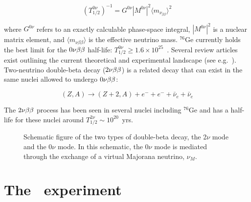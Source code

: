 		\begin{equation}
		\left( T_{1/2}^{0\nu}\right)^{-1} = G^{0\nu} |M^{0\nu}|^2 \langle m_{\nu_{\beta\beta}} \rangle^2  
		\end{equation} 

where $G^{0\nu}$ refers to an exactly calculable phase-space integral, 
$|M^{0\nu}|^2$ is a nuclear matrix element, and $\langle m_{\nu{\beta\beta}}\rangle$
is the effective neutrino mass.  $^{76}$Ge currently holds the best limit for
the $\nonubb$ half-life: $T^{0\nu}_{1/2}\geq 1.6\times10^{25}$~\cite{Bau99}.
Several review articles exist outlining the current theoretical and
experimental landscape (see e.g.~\cite{Ell02,Bara07}).  
Two-neutrino double-beta decay ($\twonubb$) is a related 
decay that can exist in the same nuclei allowed to undergo $\nonubb$:  

		\begin{equation}
		(Z,A) \rightarrow (Z+2,A) + e^- + e^- + \bar{\nu}_e + \bar{\nu}_e
		\end{equation}

The $\twonubb$ process has been seen in several nuclei including $^{76}$Ge and has
a half-life for these nuclei around $T^{2\nu}_{1/2}\sim10^{20}$~yrs.  

		\begin{figure}
			\centering
			\def\figheight{0.4\textheight}
		\caption[Schematic of $\twonubb$ and $\nonubb$ decays.]{Schematic figure of the two types of double-beta decay, 
		the 2$\nu$ mode and the 0$\nu$ mode.  
			In this schematic, the 0$\nu$ mode is mediated through the exchange of a virtual Majorana neutrino, $\nu_{M}$.}
		\label{fig:DBDK}
		\end{figure}
 

	
	\section{The \MJ\ experiment}
	\label{sec:MJExperiment}
	
